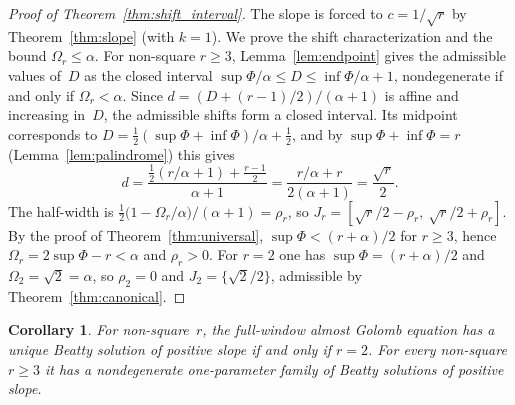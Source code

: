 \documentclass{birkjour}
\newtheorem{corollary}[theorem]{Corollary}
\theoremstyle{definition}
\theoremstyle{remark}
\begin{document}
\begin{proof}[Proof of Theorem~\ref{thm:shift_interval}]
The slope is forced to $c=1/\!\sqrt{r}$ by
Theorem~\ref{thm:slope} (with $k=1$). We prove the shift
characterization and the bound $\Omega_{r}\le\alpha$. For
non-square $r\ge 3$, Lemma~\ref{lem:endpoint} gives the
admissible values of~$D$ as the closed interval
$\sup\Phi/\alpha\le D\le\inf\Phi/\alpha+1$, nondegenerate if
and only if $\Omega_{r}<\alpha$. Since
$d=(D+(r{-}1)/2)/(\alpha+1)$ is affine and increasing in~$D$,
the admissible shifts form a closed interval. Its midpoint
corresponds to
$D=\tfrac12(\sup\Phi+\inf\Phi)/\alpha+\tfrac12$, and by
$\sup\Phi+\inf\Phi=r$ (Lemma~\ref{lem:palindrome}) this gives
\[
  d=\frac{\tfrac12(r/\alpha+1)+\tfrac{r-1}{2}}{\alpha+1}
   =\frac{r/\alpha+r}{2(\alpha+1)}=\frac{\sqrt{r}}{2}.
\]
The half-width is
$\tfrac12\bigl(1-\Omega_{r}/\alpha\bigr)/(\alpha+1)=\rho_{r}$,
so $J_{r}=[\sqrt{r}/2-\rho_{r},\ \sqrt{r}/2+\rho_{r}]$. By the
proof of Theorem~\ref{thm:universal},
$\sup\Phi<(r+\alpha)/2$ for $r\ge 3$, hence
$\Omega_{r}=2\sup\Phi-r<\alpha$ and $\rho_{r}>0$. For $r=2$ one
has $\sup\Phi=(r+\alpha)/2$ and $\Omega_{2}=\sqrt{2}=\alpha$,
so $\rho_{2}=0$ and $J_{2}=\{\sqrt{2}/2\}$, admissible by
Theorem~\ref{thm:canonical}.
\end{proof}

\begin{corollary}\label{cor:uniqueness}
For non-square~$r$, the full-window almost Golomb equation
has a unique Beatty solution of positive slope if and only if
$r=2$. For every non-square $r\ge 3$ it has a nondegenerate
one-parameter family of Beatty solutions of positive slope.
\end{corollary}
\end{document}
